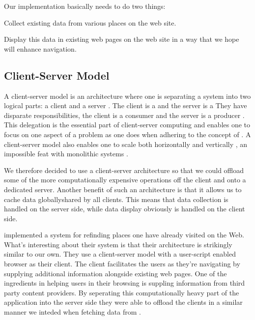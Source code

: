 Our implementation basically needs to do two things:

\begin{enum}
  \item Collect existing data from various places on the \urort{} web site.
  \item Display this data in existing web pages on the \urort{} web site in
    a way that we hope will enhance navigation.
\end{enum}

\subsection{Client-Server Model}

A client-server model is an architecture where one is separating a system into
two logical parts: a client and a server \citep[]{lewandowski98}. The
client is a 
and the server is a 
They have disparate responsibilities, the client is a consumer and the
server is a producer \citep[]{lewandowski98}. This delegation is the
essential part of client-server computing and enables one to focus on one
aspect of a problem as one does when adhering to the concept of
 \citep[]{dijkstra82}.
A client-server model also enables one to scale both horizontally and
vertically%
,
an impossible feat with monolithic systems \citep[p--8]{lewandowski98}.

We therefore decided to use a client-server architecture so that we could
offload some of the more computationally expensive operations off the client
and onto a dedicated server. Another benefit of such an architecture is that
it allows us to cache data globally\dash{}shared by all clients. This means
that data collection is handled on the server side, while data display
obviously is handled on the client side.

\citet[--888]{nishimoto06} implemented a system for refinding places one
have already visited on the Web. What's interesting about their system is that
their architecture is strikingly similar to our own. They use a
client-server model with a user-script enabled browser as their client. The
client facilitates the users as they're navigating by supplying additional
information alongside existing web pages. One of the ingredients in helping
users in their browsing is suppling information from third party content
providers. By seperating this computationally heavy part of the application
into the server side they were able to offload the clients in a similar
manner we inteded when fetching data from \urort{}.

